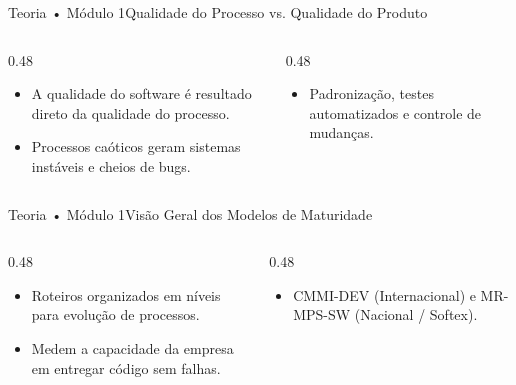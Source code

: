 \begin{senaiframe}{Teoria • Módulo 1}{Qualidade do Processo vs. Qualidade do Produto}
  \begin{columns}[t]
    \begin{column}{0.48\textwidth}
      \begin{tcolorbox}[senaibluecard, title={Premissa Fundamental}]
        \begin{itemize}
          \item A qualidade do software é resultado direto da qualidade do processo.
          \item Processos caóticos geram sistemas instáveis e cheios de bugs.
        \end{itemize}
      \end{tcolorbox}
    \end{column}
    \begin{column}{0.48\textwidth}
      \begin{tcolorbox}[senaigreencard, title={Foco em Processos}]
        \begin{itemize}
          \item Padronização, testes automatizados e controle de mudanças.
        \end{itemize}
      \end{tcolorbox}
    \end{column}
  \end{columns}
\end{senaiframe}

\begin{senaiframe}{Teoria • Módulo 1}{Visão Geral dos Modelos de Maturidade}
  \begin{columns}[t]
    \begin{column}{0.48\textwidth}
      \begin{tcolorbox}[senaibluecard, title={O que são?}]
        \begin{itemize}
          \item Roteiros organizados em níveis para evolução de processos.
          \item Medem a capacidade da empresa em entregar código sem falhas.
        \end{itemize}
      \end{tcolorbox}
    \end{column}
    \begin{column}{0.48\textwidth}
      \begin{tcolorbox}[senaicard, title={Principais Referências}]
        \begin{itemize}
          \item CMMI-DEV (Internacional) e MR-MPS-SW (Nacional / Softex).
        \end{itemize}
      \end{tcolorbox}
    \end{column}
  \end{columns}
\end{senaiframe}

